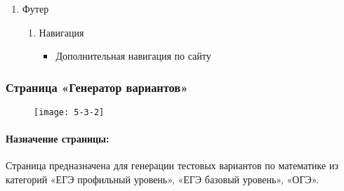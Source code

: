 \begin{enumerate}
	\item Футер
	\begin{enumerate}
		\item Навигация
		\begin{itemize}
			\item Дополнительная навигация по сайту
		\end{itemize}
	\end{enumerate}
\end{enumerate}


\subsubsection{Страница «Генератор вариантов»}
\begin{figure}[H]
	\texttt{[image: 5-3-2]}
\end{figure}
\paragraph{Назначение страницы:} Страница предназначена для генерации тестовых вариантов по математике из категорий «ЕГЭ профильный уровень», «ЕГЭ базовый уровень», «ОГЭ».


